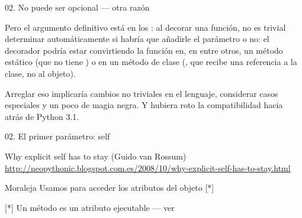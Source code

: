 \begin{frame}{02. No puede ser opcional — otra razón}
  \begin{justify}
    \small
    Pero el argumento definitivo está en los :
    al decorar una función, no es trivial determinar automáticamente
    si habría que añadirle el parámetro  o no: el
    decorador podría estar convirtiendo la función en, en entre otros,
    un método estático (que no tiene ) o en un método
    de clase (, que recibe una referencia a la
    clase, no al objeto).
  \end{justify}

  \begin{alertblock}{}
    \centering
    Arreglar eso implicaría cambios no triviales en el lenguaje,
    considerar casos especiales y un poco de magia negra. Y hubiera
    roto la compatibilidad hacia atrás de Python 3.1.
  \end{alertblock}
\end{frame}

\begin{frame}{02. El primer parámetro: self}
  \footnotesize
  \begin{block}{\centering Why explicit self has to stay (Guido van Rossum)}
    \centering \url{http://neopythonic.blogspot.com.es/2008/10/why-explicit-self-has-to-stay.html}
  \end{block}

  \vspace{0.5cm}
  {
    \normalsize
    \begin{alertblock}{\centering Moraleja}
      \centering Usamos  para acceder los atributos del objeto [*]
    \end{alertblock}
  }

  [*] Un método es un atributo ejecutable — ver 
\end{frame}
